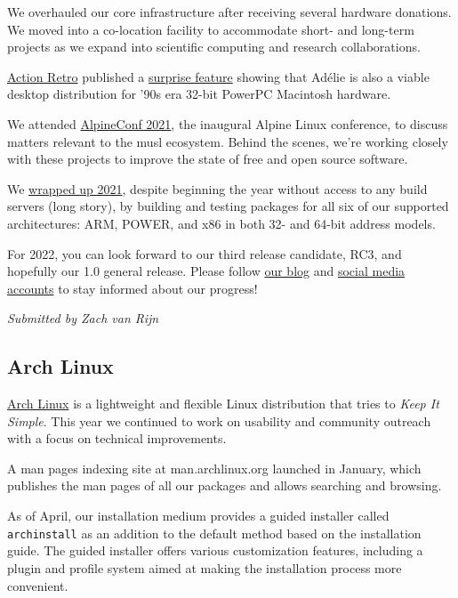 \documentclass[a4paper]{report}
\begin{document}
We overhauled our core infrastructure after receiving several hardware donations. We moved into a co-location facility to accommodate short- and long-term projects as we expand into scientific computing and research collaborations.

\href{https://actionretro.com/}{Action Retro} published a \href{https://www.youtube.com/watch?v=AArGaJGFVH4}{surprise feature} showing that Adélie is also a viable desktop distribution for '90s era 32-bit PowerPC Macintosh hardware.

We attended \href{https://alpinelinux.org/conf/}{{AlpineConf 2021}}, the inaugural Alpine Linux conference, to discuss matters relevant to the musl ecosystem. Behind the scenes, we're working closely with these projects to improve the state of free and open source software.

We \href{https://blog.adelielinux.org/2021/12/31/new-year-new-builders/}{wrapped up 2021}, despite beginning the year without access to any build servers (long story), by building and testing packages for all six of our supported architectures: ARM, POWER, and x86 in both 32- and 64-bit address models.

For 2022, you can look forward to our third release candidate, RC3, and hopefully our 1.0 general release. Please follow \href{https://blog.adelielinux.org/}{our blog} and \href{https://www.adelielinux.org/contact/}{social media accounts} to stay informed about our progress!

{\em Submitted by Zach van Rijn}

\subsection{Arch Linux}

\href{https://archlinux.org/}{Arch Linux} is a lightweight and flexible Linux distribution that tries to \textit{Keep It Simple}.  This year we continued to work on usability and community outreach with a focus on technical improvements.

A man pages indexing site at man.archlinux.org launched in January, which publishes the man pages of all our packages and allows searching and browsing.

As of April, our installation medium provides a guided installer called \texttt{archinstall} as an addition to the default method based on the installation guide. The guided installer offers various customization features, including a plugin and profile system aimed at making the installation process more convenient.
\end{document}
